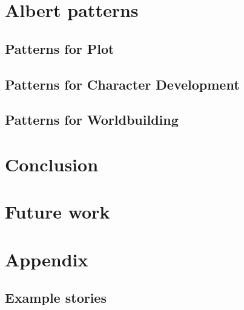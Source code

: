 \documentclass{tufte-handout}
\begin{document}
\section{Albert patterns}

\subsection{Patterns for Plot}

\subsection{Patterns for Character Development}

\subsection{Patterns for Worldbuilding}

\section{Conclusion}

\section{Future work}

\appendix
\section{Appendix}

\subsection{Example stories}
\end{document}
